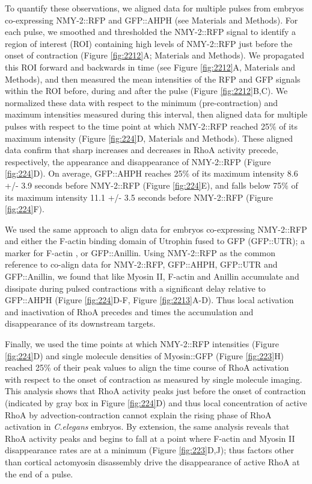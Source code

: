 To quantify these observations, we aligned data for multiple pulses from embryos co-expressing NMY-2::RFP and GFP::AHPH (see Materials and Methods). For each pulse, we smoothed and thresholded the NMY-2::RFP signal to identify a region of interest (ROI) containing high levels of NMY-2::RFP just before the onset of contraction (Figure \ref{fig:2212}A; Materials and Methods). We propagated this ROI forward and backwards in time (see Figure \ref{fig:2212}A, Materials and Methods), and then measured the mean intensities of the RFP and GFP signals within the ROI before, during and after the pulse (Figure \ref{fig:2212}B,C). We normalized these data with respect to the minimum (pre-contraction) and maximum intensities measured during this interval, then aligned data for multiple pulses with respect to the time point at which NMY-2::RFP reached 25$\%$ of its maximum intensity (Figure \ref{fig:224}D, Materials and Methods). These aligned data confirm that sharp increases and decreases in RhoA activity precede, respectively, the appearance and disappearance of NMY-2::RFP (Figure \ref{fig:224}D).  On average, GFP::AHPH reaches 25$\%$ of its maximum intensity 8.6 +/- 3.9 seconds before NMY-2::RFP (Figure \ref{fig:224}E), and falls below 75$\%$ of its maximum intensity 11.1 +/- 3.5 seconds before NMY-2::RFP (Figure \ref{fig:224}F).

We used the same approach to align data for embryos co-expressing NMY-2::RFP and either the F-actin binding domain of Utrophin fused to GFP (GFP::UTR); a marker for F-actin  \cite{Burkel:2007fj,Tse:2012fp}, or GFP::Anillin. Using NMY-2::RFP as the common reference to co-align data for NMY-2::RFP, GFP::AHPH, GFP::UTR and GFP::Anillin, we found that like Myosin II, F-actin and Anillin accumulate and dissipate during pulsed contractions with a significant delay relative to GFP::AHPH (Figure \ref{fig:224}D-F, Figure \ref{fig:2213}A-D). Thus local activation and inactivation of RhoA precedes and times the accumulation and disappearance of its downstream targets. 

Finally, we used the time points at which NMY-2::RFP intensities (Figure \ref{fig:224}D) and single molecule densities of Myosin::GFP (Figure \ref{fig:223}H) reached 25$\%$ of their peak values to align the time course of RhoA activation with respect to the onset of contraction as measured by single molecule imaging.  This analysis shows that RhoA activity peaks just before the onset of contraction (indicated by gray box in Figure \ref{fig:224}D) and thus local concentration of active RhoA by advection-contraction  \cite{Munjal:2015bx} cannot explain the rising phase of RhoA activation in \textit{C.elegans} embryos.  By extension, the same analysis reveals that RhoA activity peaks and begins to fall at a point where F-actin and Myosin II disappearance rates are at a minimum (Figure \ref{fig:223}D,J); thus factors other than cortical actomyosin disassembly drive the disappearance of active RhoA at the end of a pulse.


